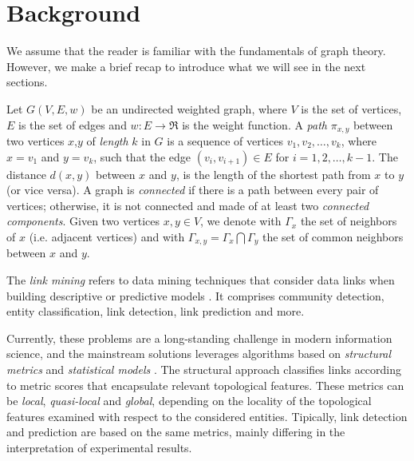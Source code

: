 \section{Background}
\label{sec:background}

We assume that the reader is familiar with the fundamentals of graph theory. 
However, we make a brief recap to introduce what we will see in the next sections.

Let $G(V,E,w)$ be an undirected weighted graph, where $V$ is the set of vertices, $E$ is the set of edges and $w:E\rightarrow\Re$ is the weight function. 
A \textit{path} $\pi_{x,y}$ between two vertices $x$,$y$ of \textit{length} $k$ in $G$ is a sequence of vertices $v_{1},v_{2},\ldots,v_{k}$, where $x = v_{1}$ and $y = v_{k}$, such that the edge $(v_{i},v_{i+1}) \in E$ for $i = 1, 2,\ldots,k-1$. 
The distance $d(x,y)$ between $x$ and $y$, is the length of the shortest path from $x$ to $y$ (or vice versa).
A graph is \textit{connected} if there is a path between every pair of vertices; otherwise, it is not connected and made of at least two \textit{connected components}.
Given two vertices $x,y \in V$, we denote with $\Gamma_{x}$ the set of neighbors of $x$ (i.e. adjacent vertices) and with $\Gamma_{x,y} = \Gamma_{x} \bigcap \Gamma_{y}$ the set of common neighbors between $x$ and $y$.

The \textit{link mining} refers to data mining techniques that consider data links when building descriptive or predictive models \cite{getoor2005link}. It comprises community detection, entity classification, link detection, link prediction and more. 

Currently, these problems are a long-standing challenge in modern information science, and the mainstream solutions leverages algorithms based on \textit{structural metrics} and \textit{statistical models} \cite{Liben-Nowell,Lu2011}.
The structural approach classifies links according to metric scores that encapsulate relevant topological features. 
These metrics can be \textit{local}, \textit{quasi-local} and \textit{global}, depending on the locality of the topological features examined with respect to the considered entities.
Tipically, link detection and prediction are based on the same metrics, mainly differing in the interpretation of experimental results.


